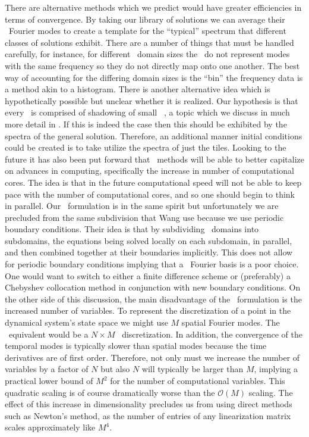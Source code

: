 There are alternative methods which we
predict would have greater efficiencies
in terms of convergence.
By taking our library of solutions we can average their
\spt\ Fourier modes to create a template for the ``typical'' spectrum
that different classes of solutions exhibit. There are a number
of things that must be handled carefully, for instance,
for different \spt\ domain sizes the \Fcs\ do not represent
modes with the same frequency so they do not directly map onto
one another. The best way of accounting for the differing domain
sizes is the ``bin'' the frequency data is a method
akin to a histogram. There is another alternative
idea which is hypothetically possible but unclear
whether it is realized.
Our hypothesis is that every \twot\ is comprised of
shadowing of small \spt\ \twots, a topic which we discuss in
much more detail in . If this is
indeed the case then this should be exhibited by
the spectra of the general solution. Therefore,
an additional manner initial conditions could be
created is to take utilize the spectra of just the
tiles.
Looking to the future it has also been put forward that \spt\ methods
will be able to better capitalize on advances in computing, specifically
the increase in number of computational cores.
The idea is that in the future computational speed will not be able
to keep pace with the number of computational cores, and so
one should begin to think in parallel.
Our \spt\ formulation is in the same spirit but unfortunately
we are precluded from the same subdivision that Wang \etal{} use
because we use periodic boundary conditions. Their idea
is that by subdividing \spt\ domains into subdomains, the equations
being solved locally on each subdomain, in parallel, and then combined
together at their boundaries implicitly. This does not allow for
periodic boundary conditions implying that a \spt\ Fourier basis
is a poor choice. One would want to switch
to either a finite difference scheme or (preferably) a Chebyshev
collocation method in conjunction with new boundary conditions.
On the other side of this discussion, the main
disadvantage of the \spt\ formulation is the increased
number of variables.
To represent the discretization of
a point in the dynamical system's state space we
might use $M$ spatial Fourier modes. The \spt\ equivalent would
be a $N \times M$ \spt\ discretization. In addition, the convergence of
the temporal modes is typically slower than spatial modes because
the time derivatives are of first order. Therefore, not
only must we increase the number of variables by a factor of $N$
but also $N$ will typically be larger than $M$, implying a practical
lower bound of $M^2$ for the number of computational variables. This
quadratic scaling is of course dramatically worse than the $\mathcal{O}(M)$
scaling. The effect of this increase in dimensionality precludes
us from using direct methods such as Newton's method,
as the number of entries of any linearization matrix scales approximately
like $M^4$.


